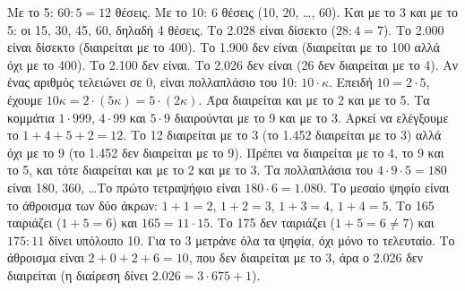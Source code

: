  Με το 5: $60:5=12$ θέσεις. Με το 10: 6 θέσεις (10, 20, \dots, 60). Και με το 3 και με το 5: οι 15, 30, 45, 60, δηλαδή 4 θέσεις.
 Το 2.028 είναι δίσεκτο ($28:4=7$). Το 2.000 είναι δίσεκτο (διαιρείται με το 400). Το 1.900 δεν είναι (διαιρείται με το 100 αλλά όχι με το 400). Το 2.100 δεν είναι. Το 2.026 δεν είναι (26 δεν διαιρείται με το 4).
 Αν ένας αριθμός τελειώνει σε 0, είναι πολλαπλάσιο του 10: $10\cdot\kappa$. Επειδή $10=2\cdot 5$, έχουμε $10\kappa=2\cdot(5\kappa)=5\cdot(2\kappa)$. Άρα διαιρείται και με το 2 και με το 5.
 Τα κομμάτια $1\cdot 999$, $4\cdot 99$ και $5\cdot 9$ διαιρούνται με το 9 και με το 3. Αρκεί να ελέγξουμε το $1+4+5+2=12$. Το 12 διαιρείται με το 3 (το 1.452 διαιρείται με το 3) αλλά όχι με το 9 (το 1.452 δεν διαιρείται με το 9).
 Πρέπει να διαιρείται με το 4, το 9 και το 5, και τότε διαιρείται και με το 2 και με το 3. Τα πολλαπλάσια του $4\cdot 9\cdot 5=180$ είναι 180, 360, \dots Το πρώτο τετραψήφιο είναι $180\cdot 6=1.080$.
 Το μεσαίο ψηφίο είναι το άθροισμα των δύο άκρων: $1+1=2$, $1+2=3$, $1+3=4$, $1+4=5$. Το 165 ταιριάζει ($1+5=6$) και $165=11\cdot 15$. Το 175 δεν ταιριάζει ($1+5=6\neq 7$) και $175:11$ δίνει υπόλοιπο 10.
 Για το 3 μετράνε όλα τα ψηφία, όχι μόνο το τελευταίο. Το άθροισμα είναι $2+0+2+6=10$, που δεν διαιρείται με το 3, άρα ο 2.026 δεν διαιρείται (η διαίρεση δίνει $2.026=3\cdot 675+1$).
